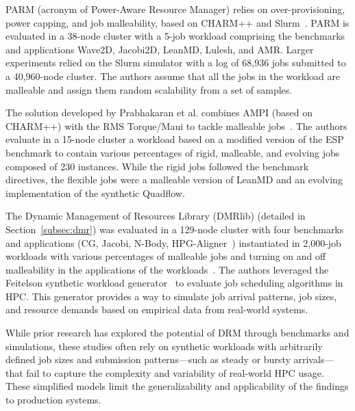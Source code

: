 \documentclass[a4paper,fleqn]{cas-dc}
\begin{document}
PARM (acronym of Power-Aware Resource Manager) relies on over-provisioning, power capping, and job malleability, based on CHARM++ and Slurm~\cite{sarood_maximizing_2014}.
PARM is evaluated in a 38-node cluster with a 5-job workload comprising the benchmarks and applications Wave2D, Jacobi2D, LeanMD, Lulesh, and AMR.
Larger experiments relied on the Slurm simulator with a log of 68,936 jobs submitted to a 40,960-node cluster. The authors assume that all the jobs in the workload are malleable and assign them random scalability from a set of samples.

The solution developed by Prabhakaran et al. combines AMPI (based on CHARM++) with the RMS Torque/Maui to tackle malleable jobs~\cite{prabhakaran_batch_2015}. 
The authors evaluate in a 15-node cluster a workload based on a modified version of the ESP benchmark to contain various percentages of rigid, malleable, and evolving jobs composed of 230 instances.
While the rigid jobs followed the benchmark directives, the flexible jobs were a malleable version of LeanMD and an evolving implementation of the synthetic Quadflow.

The Dynamic Management of Resources Library (DMRlib) (detailed in Section~\ref{subsec:dmr}) was evaluated in a 129-node cluster with four benchmarks and applications (CG, Jacobi, N-Body, HPG-Aligner~\cite{iserte_dynamic_2019}) instantiated in 2,000-job workloads with various percentages of malleable jobs and turning on and off malleability in the applications of the workloads~\cite{iserte_dmrlib_2020}.
The authors leveraged the Feitelson synthetic workload generator~\cite{feitelson_towards_1996} to evaluate job scheduling algorithms in HPC.
This generator provides a way to simulate job arrival patterns, job sizes, and resource demands based on empirical data from real-world systems.



While prior research has explored the potential of DRM through benchmarks and simulations, these studies often rely on synthetic workloads with arbitrarily defined job sizes and submission patterns—such as steady or bursty arrivals—that fail to capture the complexity and variability of real-world HPC usage. These simplified models limit the generalizability and applicability of the findings to production systems.
\end{document}
